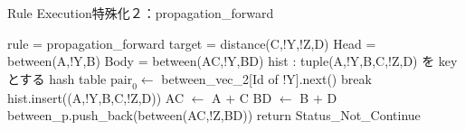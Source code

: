 \begin{algorithm}
    \caption{Rule Execution特殊化２：propagation\_forward}
\begin{algorithmic}
    \scriptsize
    \Require rule = propagation\_forward
    \Require target = distance(C,!Y,!Z,D) 
    \Require Head = {between(A,!Y,B)}
    \Require Body = {between(AC,!Y,BD)}
    \Require hist : tuple(A,!Y,B,C,!Z,D) を key とする hash table 
            \State $\text{pair}_0 \gets$ between\_vec\_2[Id of !Y].next() 
             
                \State break
            \EndIf
                \State hist.insert((A,!Y,B,C,!Z,D))
                \State AC $\gets$ A $+$ C
                \State BD $\gets$ B $+$ D
                \State between\_p.push\_back(between(AC,!Z,BD))
            \EndIf
        \EndWhile
        \State return Status\_Not\_Continue
    \EndProcedure
\end{algorithmic}
\end{algorithm}